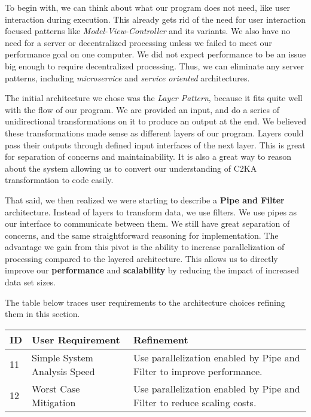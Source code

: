 \documentclass[11pt]{article}
\begin{document}
    To begin with, we can think about what our program does not need, like user interaction during execution.
    This already gets rid of the need for user interaction focused patterns like \textit{Model-View-Controller} and its variants.
    We also have no need for a server or decentralized processing unless we failed to meet our performance goal on one computer.
    We did not expect performance to be an issue big enough to require decentralized processing.
    Thus, we can eliminate any server patterns, including \textit{microservice} and \textit{service oriented} architectures.

    The initial architecture we chose was the \textit{Layer Pattern}, because it fits quite well with the flow of our program.
    We are provided an input, and do a series of unidirectional transformations on it to produce an output at the end.
    We believed these transformations made sense as different layers of our program.
    Layers could pass their outputs through defined input interfaces of the next layer.
    This is great for separation of concerns and maintainability.
    It is also a great way to reason about the system allowing us to convert our understanding of C2KA transformation to code easily.

    That said, we then realized we were starting to describe a \textbf{Pipe and Filter} architecture.
    Instead of layers to transform data, we use filters.
    We use pipes as our interface to communicate between them.
    We still have great separation of concerns, and the same straightforward reasoning for implementation.
    The advantage we gain from this pivot is the ability to increase parallelization of processing compared to the layered architecture.
    This allows us to directly improve our \textbf{performance} and \textbf{scalability} by reducing the impact of increased data set sizes.

    The table below traces user requirements to the architecture choices refining them in this section.

    \begin{table}[htbp]
        \centering
        \begin{tabularx}{\textwidth}{| l | l | X |}
            \hline
            \textbf{ID} & \textbf{User Requirement} & \textbf{Refinement} \\
            \hline
            11 & Simple System Analysis Speed & Use parallelization enabled by Pipe and Filter to improve performance. \\ \hline
            12 & Worst Case Mitigation & Use parallelization enabled by Pipe and Filter to reduce scaling costs.  \\ \hline
        \end{tabularx}\label{tab:arch-choice-table}
    \end{table}
\end{document}
